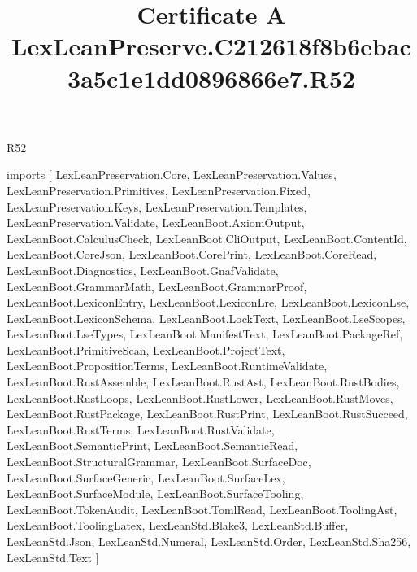 \begin{lexlean}{R52}
\title{Certificate A LexLeanPreserve.C212618f8b6ebac3a5c1e1dd0896866e7.R52}
\begin{coremodule}
imports [
  LexLeanPreservation.Core,
  LexLeanPreservation.Values,
  LexLeanPreservation.Primitives,
  LexLeanPreservation.Fixed,
  LexLeanPreservation.Keys,
  LexLeanPreservation.Templates,
  LexLeanPreservation.Validate,
  LexLeanBoot.AxiomOutput,
  LexLeanBoot.CalculusCheck,
  LexLeanBoot.CliOutput,
  LexLeanBoot.ContentId,
  LexLeanBoot.CoreJson,
  LexLeanBoot.CorePrint,
  LexLeanBoot.CoreRead,
  LexLeanBoot.Diagnostics,
  LexLeanBoot.GnafValidate,
  LexLeanBoot.GrammarMath,
  LexLeanBoot.GrammarProof,
  LexLeanBoot.LexiconEntry,
  LexLeanBoot.LexiconLre,
  LexLeanBoot.LexiconLse,
  LexLeanBoot.LexiconSchema,
  LexLeanBoot.LockText,
  LexLeanBoot.LseScopes,
  LexLeanBoot.LseTypes,
  LexLeanBoot.ManifestText,
  LexLeanBoot.PackageRef,
  LexLeanBoot.PrimitiveScan,
  LexLeanBoot.ProjectText,
  LexLeanBoot.PropositionTerms,
  LexLeanBoot.RuntimeValidate,
  LexLeanBoot.RustAssemble,
  LexLeanBoot.RustAst,
  LexLeanBoot.RustBodies,
  LexLeanBoot.RustLoops,
  LexLeanBoot.RustLower,
  LexLeanBoot.RustMoves,
  LexLeanBoot.RustPackage,
  LexLeanBoot.RustPrint,
  LexLeanBoot.RustSucceed,
  LexLeanBoot.RustTerms,
  LexLeanBoot.RustValidate,
  LexLeanBoot.SemanticPrint,
  LexLeanBoot.SemanticRead,
  LexLeanBoot.StructuralGrammar,
  LexLeanBoot.SurfaceDoc,
  LexLeanBoot.SurfaceGeneric,
  LexLeanBoot.SurfaceLex,
  LexLeanBoot.SurfaceModule,
  LexLeanBoot.SurfaceTooling,
  LexLeanBoot.TokenAudit,
  LexLeanBoot.TomlRead,
  LexLeanBoot.ToolingAst,
  LexLeanBoot.ToolingLatex,
  LexLeanStd.Blake3,
  LexLeanStd.Buffer,
  LexLeanStd.Json,
  LexLeanStd.Numeral,
  LexLeanStd.Order,
  LexLeanStd.Sha256,
  LexLeanStd.Text
]


\end{coremodule}
\end{lexlean}
